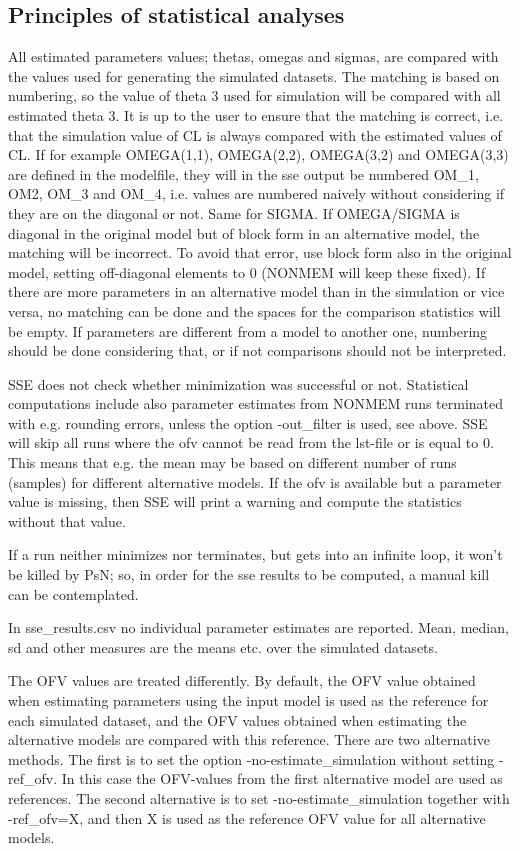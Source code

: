 \subsection{Principles of statistical analyses}

All estimated parameters values; thetas, omegas and sigmas, are compared with the values used for generating the simulated datasets. The matching is based on numbering, so the value of theta 3 used for simulation will be compared with all estimated theta 3. It is up to the user to ensure that the matching is correct, i.e. that the simulation value of CL is always compared with the estimated values of CL. 
If for example OMEGA(1,1), OMEGA(2,2), OMEGA(3,2) and OMEGA(3,3) are defined in the modelfile, they will in the sse output be numbered OM\_1, OM2, OM\_3 and OM\_4, i.e. values are numbered naively without considering if they are on the diagonal or not. Same for SIGMA. 
If OMEGA/SIGMA is diagonal in the original model but of block form in an alternative model, the matching will be incorrect. To avoid that error, use block form also in the original model, setting off-diagonal elements to 0 (NONMEM will keep these fixed). If there are more parameters in an alternative model than in the simulation or vice versa, no matching can be done and the spaces for the comparison statistics will be empty. If parameters are different from a model to another one, numbering should be done considering that, or if not comparisons should not be interpreted. 

SSE does not check whether minimization was successful or not. Statistical computations include also parameter estimates from NONMEM runs terminated with e.g. rounding errors, unless the option -out\_filter is used, see above. SSE will skip all runs where the ofv cannot be read from the lst-file  or is equal to 0. This means that e.g. the mean may be based on different number of runs (samples) for different alternative models. If the ofv is available but a parameter value is missing, then SSE will print a warning and compute the statistics without that value. 

If a run neither minimizes nor terminates, but gets into an infinite loop, it won't be killed by PsN; so, in order for the sse results to be computed, a manual kill can be contemplated.

In sse\_results.csv no individual parameter estimates are reported. Mean, median, sd and other measures are the means etc. over the simulated datasets.

The OFV values are treated differently. By default, the OFV value obtained when estimating parameters using the input model is used as the reference for each simulated dataset, and the OFV values obtained when estimating the alternative models are compared with this reference. There are two alternative methods. The first is to set the option -no-estimate\_simulation without setting -ref\_ofv. In this case the OFV-values from the first alternative model are used as references. The second alternative is to set -no-estimate\_simulation together with -ref\_ofv=X, and then X is used as the reference OFV value for all alternative models.


